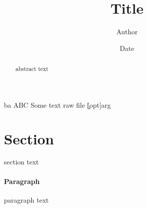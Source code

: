\documentclass{clazz}
\title{Title}
\author{Author}
\date{Date}
\begin{document}
\maketitle
\begin{abstract}
abstract text
\end{abstract}
\tableofcontents
\begin{someEnv}{ba}
ABC\newlineDEF
Some text \newlinein raw file
\c[opt]{arg}
\end{someEnv}
\section{Section}
section text
\paragraph*{Paragraph}
paragraph text
\end{document}
